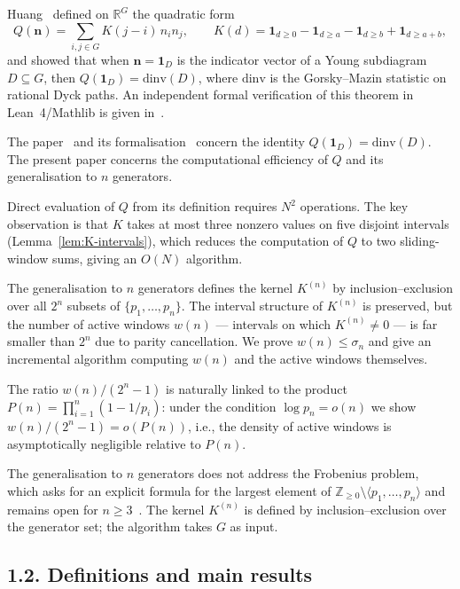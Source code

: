 \documentclass[11pt,a4paper]{amsart}
\theoremstyle{plain}
\theoremstyle{definition}
\theoremstyle{remark}
\begin{document}
Huang~\cite{Huang2026} defined on $\mathbb{R}^G$ the quadratic form
\[
  Q(\mathbf{n}) = \sum_{i,j \in G} K(j - i)\, n_i n_j,
  \qquad
  K(d) = \mathbf{1}_{d \geq 0} - \mathbf{1}_{d \geq a}
         - \mathbf{1}_{d \geq b} + \mathbf{1}_{d \geq a+b},
\]
and showed that when $\mathbf{n} = \mathbf{1}_D$ is the indicator vector
of a Young subdiagram $D \subseteq G$, then $Q(\mathbf{1}_D) = \mathrm{dinv}(D)$,
where $\mathrm{dinv}$ is the Gorsky--Mazin statistic on rational Dyck paths.
An independent formal verification of this theorem in
Lean~4/Mathlib is given in~\cite{AxiomProver2026}.

The paper~\cite{Huang2026} and its formalisation~\cite{AxiomProver2026}
concern the identity $Q(\mathbf{1}_D) = \mathrm{dinv}(D)$.
The present paper concerns the computational efficiency of $Q$
and its generalisation to $n$ generators.

Direct evaluation of $Q$ from its definition requires $N^2$ operations.
The key observation is that $K$ takes at most three nonzero values
on five disjoint intervals (Lemma~\ref{lem:K-intervals}), which reduces
the computation of $Q$ to two sliding-window sums, giving an $O(N)$
algorithm.

The generalisation to $n$ generators defines the kernel $K^{(n)}$
by inclusion--exclusion over all $2^n$ subsets of $\{p_1, \ldots, p_n\}$.
The interval structure of $K^{(n)}$ is preserved, but the number of
active windows $w(n)$ --- intervals on which $K^{(n)} \neq 0$ ---
is far smaller than $2^n$ due to parity cancellation.
We prove $w(n) \leq \sigma_n$ and give an incremental algorithm
computing $w(n)$ and the active windows themselves.

The ratio $w(n)/(2^n - 1)$ is naturally linked to the product
$P(n) = \prod_{i=1}^n (1 - 1/p_i)$: under the condition
$\log p_n = o(n)$ we show $w(n)/(2^n-1) = o(P(n))$,
i.e., the density of active windows is asymptotically negligible
relative to $P(n)$.

The generalisation to $n$ generators does not address the Frobenius
problem, which asks for an explicit formula for the largest element of
$\mathbb{Z}_{\geq 0} \setminus \langle p_1,\ldots,p_n \rangle$
and remains open for $n \geq 3$~\cite{Ramirez2005}.
The kernel $K^{(n)}$ is defined by inclusion--exclusion over the
generator set; the algorithm takes $G$ as input.

\subsection*{1.2. Definitions and main results}
\end{document}
